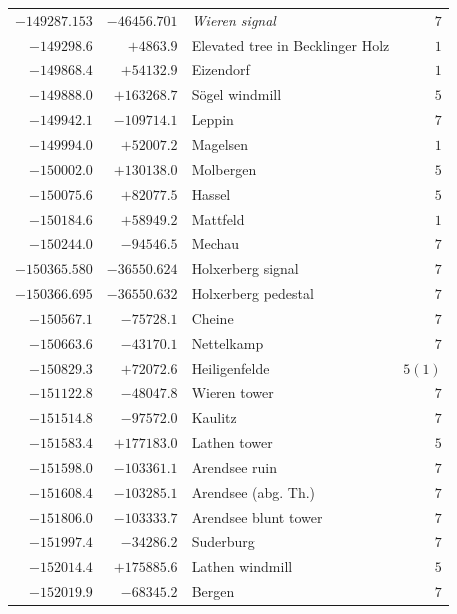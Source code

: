 \begin{center}
\begin{tabular}{r|r|p{170pt}|r}
\(-149287.153\)&\(-46456.701\)&\textit{Wieren signal}&\(7\)\\
\(-149298.6\)&\(+4863.9\)&Elevated tree in Becklinger Holz&\(1\)\\
\(-149868.4\)&\(+54132.9\)&Eizendorf&\(1\)\\
\(-149888.0\)&\(+163268.7\)&Sögel windmill&\(5\)\\
\(-149942.1\)&\(-109714.1\)&Leppin&\(7\)\\
\(-149994.0\)&\(+52007.2\)&Magelsen&\(1\)\\
\(-150002.0\)&\(+130138.0\)&Molbergen&\(5\)\\
\(-150075.6\)&\(+82077.5\)&Hassel&\(5\)\\
\(-150184.6\)&\(+58949.2\)&Mattfeld&\(1\)\\
\(-150244.0\)&\(-94546.5\)&Mechau&\(7\)\\
\(-150365.580\)&\(-36550.624\)&Holxerberg signal&\(7\)\\
\(-150366.695\)&\(-36550.632\)&Holxerberg pedestal&\(7\)\\
\(-150567.1\)&\(-75728.1\)&Cheine&\(7\)\\
\(-150663.6\)&\(-43170.1\)&Nettelkamp&\(7\)\\
\(-150829.3\)&\(+72072.6\)&Heiligenfelde&\(5 (1)\)\\
\(-151122.8\)&\(-48047.8\)&Wieren tower&\(7\)\\
\(-151514.8\)&\(-97572.0\)&Kaulitz&\(7\)\\
\(-151583.4\)&\(+177183.0\)&Lathen tower&\(5\)\\
\(-151598.0\)&\(-103361.1\)&Arendsee ruin&\(7\)\\
\(-151608.4\)&\(-103285.1\)&Arendsee (abg. Th.)&\(7\)\\
\(-151806.0\)&\(-103333.7\)&Arendsee blunt tower&\(7\)\\
\(-151997.4\)&\(-34286.2\)&Suderburg&\(7\)\\
\(-152014.4\)&\(+175885.6\)&Lathen windmill&\(5\)\\
\(-152019.9\)&\(-68345.2\)&Bergen&\(7\)\\
\hline\end{tabular}\endgroup\end{center}
\clearpage
